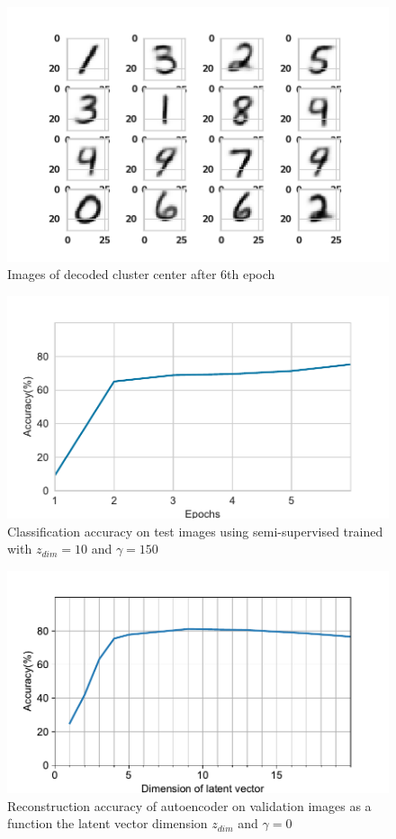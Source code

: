 \documentclass{uai2021} %
\begin{document}
\begin{figure}[]
\centering
\includegraphics[width=\linewidth]{cluster_centers_epoch_6.0}
\caption{Images of decoded cluster center after 6th epoch}
\label{cluster_center_6}
\end{figure}

\begin{figure}[]
\centering
\includegraphics[width=\linewidth]{classification_accuracy}
\caption{Classification accuracy on test images using semi-supervised trained with $z_{dim}=10$ and $\gamma = 150$}
\label{classification_accuracy}
\end{figure}

\begin{figure}[]
\centering
\includegraphics[width=\linewidth]{reconstruction_accuracy}
\caption{Reconstruction accuracy of autoencoder on validation images as a function the latent vector dimension  $z_{dim}$ and $\gamma = 0$}
\label{reconstruction_accuracy}
\end{figure}
\end{document}
